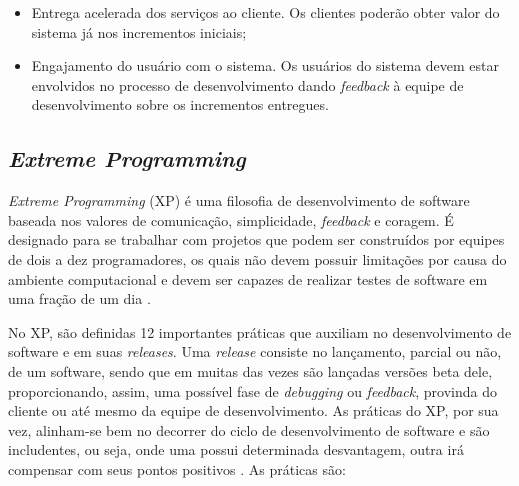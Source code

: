 \begin{itemize}
    \item Entrega acelerada dos serviços ao cliente. Os clientes poderão obter valor do sistema já nos incrementos iniciais;
    \item Engajamento do usuário com o sistema. Os usuários do sistema devem estar envolvidos no processo
    de desenvolvimento dando \textit{feedback} à equipe de desenvolvimento sobre os incrementos entregues.
\end{itemize}

    \subsection{\textit{Extreme Programming}}
    \textit{Extreme Programming} (XP) é uma filosofia de desenvolvimento de software baseada nos valores de comunicação, simplicidade, \textit{feedback} e coragem. É designado para se trabalhar com projetos que podem ser
    construídos por equipes de dois a dez programadores, os quais não devem possuir limitações
    por causa do ambiente computacional e devem ser capazes de realizar testes de
    software em uma fração de um dia \cite{beck_2004}.

    No XP, são definidas 12 importantes práticas que auxiliam no
    desenvolvimento de software e em suas \textit{releases}.
    Uma \textit{release} consiste no lançamento, parcial ou não,
    de um software, sendo que em muitas das vezes são
    lançadas versões beta dele, proporcionando, assim, uma possível
    fase de \textit{debugging} ou \textit{feedback}, provinda do
    cliente ou até mesmo da equipe de desenvolvimento. As práticas do XP, por sua vez, alinham-se bem no decorrer do ciclo de desenvolvimento de software e são includentes, ou seja, onde uma possui determinada desvantagem, outra
    irá compensar com seus pontos positivos \cite{beck_2004}. As práticas são:

